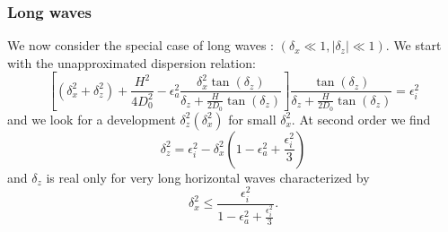 \subsubsection{Long waves}
\label{seclongwaves}
We now consider the special case of long waves : $(\delta_x \ll 1, |\delta_z| \ll 1)$. We start with the unapproximated dispersion relation:
\[
\left[
\left(\delta_x^2+\delta_z^2\right)
+\frac{H^2}{4D_0^2}
-\epsilon_a^2
\frac{\delta_x^2\tan(\delta_z)}{\delta_z+\frac{H}{2D_0}\tan(\delta_z)}
\right]\frac{\tan(\delta_z)}{\delta_z+\frac{H}{2D_0}\tan(\delta_z)}=\epsilon_i^2
\]
and we look for a development $\delta_z^2(\delta_x^2)$ for small $\delta_x^2$.
At second order we find
\begin{equation}
\delta_z^2=
\epsilon_i^2-\delta_x^2\left(
1-\epsilon_a^2+\frac{\epsilon_i^2}{3}
\right)
\label{eqlongwaves}
\end{equation}
and $\delta_z$ is real only for very long horizontal waves characterized by
\[
\delta_x^2\le \frac{\epsilon_i^2}{1-\epsilon_a^2+\frac{\epsilon_i^2}{3}}.
\]
